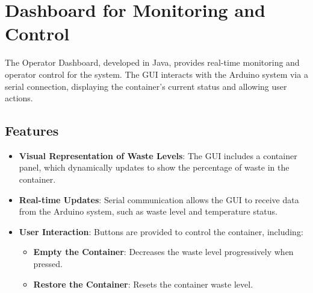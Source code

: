 \documentclass[a4paper]{article}
\begin{document}
	\section{Dashboard for Monitoring and Control}
	The Operator Dashboard, developed in Java, provides real-time monitoring and operator control for the system. The GUI interacts with the Arduino system via a serial connection, displaying the container's current status and allowing user actions.

	\subsection{Features}
	\begin{itemize}
		\item \textbf{Visual Representation of Waste Levels}: 
		The GUI includes a container panel, which dynamically updates to show the percentage of waste in the container.
		\item \textbf{Real-time Updates}: 
		Serial communication allows the GUI to receive data from the Arduino system, such as waste level and temperature status.
		\item \textbf{User Interaction}: 
		Buttons are provided to control the container, including:
		\begin{itemize}
			\item \textbf{Empty the Container}: Decreases the waste level progressively when pressed.
			\item \textbf{Restore the Container}: Resets the container waste level.
		\end{itemize}
	\end{itemize}
\end{document}
